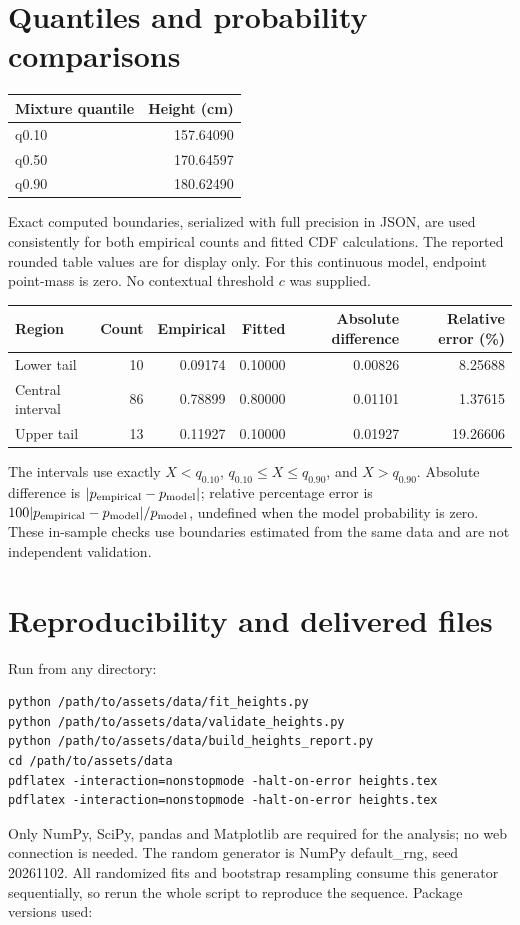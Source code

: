 \documentclass[11pt,a4paper]{article}
\begin{document}
\clearpage\footnotesize\setlength{\parskip}{4pt}\section*{Quantiles and probability comparisons}
\begin{center}
\small
\begin{tabular}{lr}
\toprule
Mixture quantile & Height (cm)\\
\midrule
q0.10 & 157.64090\\
q0.50 & 170.64597\\
q0.90 & 180.62490\\
\bottomrule
\end{tabular}
\end{center}
Exact computed boundaries, serialized with full precision in JSON, are used consistently for both empirical counts and fitted CDF calculations. The reported rounded table values are for display only. For this continuous model, endpoint point-mass is zero. No contextual threshold $c$ was supplied.

\begin{center}
\small
\begin{tabular}{lrrrrr}
\toprule
Region & Count & Empirical & Fitted & Absolute difference & Relative error (\%)\\
\midrule
Lower tail & 10 & 0.09174 & 0.10000 & 0.00826 & 8.25688\\
Central interval & 86 & 0.78899 & 0.80000 & 0.01101 & 1.37615\\
Upper tail & 13 & 0.11927 & 0.10000 & 0.01927 & 19.26606\\
\bottomrule
\end{tabular}
\end{center}
The intervals use exactly $X<q_{0.10}$,
$q_{0.10}\leq X\leq q_{0.90}$, and $X>q_{0.90}$.
Absolute difference is $|p_{\rm empirical}-p_{\rm model}|$; relative percentage
error is $100|p_{\rm empirical}-p_{\rm model}|/p_{\rm model}$, undefined when
the model probability is zero. These in-sample checks use boundaries estimated
from the same data and are not independent validation.
\section*{Reproducibility and delivered files}
Run from any directory:
\begin{verbatim}
python /path/to/assets/data/fit_heights.py
python /path/to/assets/data/validate_heights.py
python /path/to/assets/data/build_heights_report.py
cd /path/to/assets/data
pdflatex -interaction=nonstopmode -halt-on-error heights.tex
pdflatex -interaction=nonstopmode -halt-on-error heights.tex
\end{verbatim}
Only NumPy, SciPy, pandas and Matplotlib are required for the analysis;
no web connection is needed. The random generator is NumPy default\_rng,
seed 
20261102. All randomized fits and bootstrap resampling consume this generator sequentially, so rerun the whole script to reproduce the sequence. Package versions used:
\end{document}
